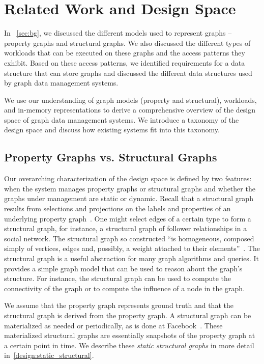 \chapter{Related Work and Design Space}
\label{chap:design_space}

In ~\autoref{sec:bg}, we discussed the different models used to represent graphs -- property graphs and structural graphs. 
We also discussed the different types of workloads that can be executed on these graphs and the access patterns they exhibit.
Based on these access patterns, we identified requirements for a data structure that can store graphs and discussed the different data structures used by graph data management systems.

We use our understanding of graph models (property and structural), workloads, and in-memory representations to derive a comprehensive overview of the design space of graph data management systems.
We introduce a taxonomy of the design space and discuss how existing systems fit into this taxonomy.


\section{Property Graphs vs. Structural Graphs}
\label{design:property_vs_structural}
Our overarching characterization of the design space is defined by two features: when the system manages property graphs or structural graphs and whether the graphs under management are static or dynamic.
Recall that a structural graph results from selections and projections on the labels and properties of an underlying property graph~\cite{RodriguezNeubauer2010}.
One might select edges of a certain type to form a structural graph, for instance, a structural graph of follower relationships in a social network.
The structural graph so constructed ``is homogeneous, composed simply of vertices, edges and, possibly, a weight attached to their elements''~\cite{teseo2021deLeo}.
The structural graph is a useful abstraction for many graph algorithms and queries. It provides a simple graph model that can be used to reason about the graph's structure.
For instance, the structural graph can be used to compute the connectivity of the graph or to compute the influence of a node in the graph.

We assume that the property graph represents ground truth and that the structural graph is derived from the property graph.
A structural graph can be materialized as needed or periodically, as is done at Facebook~\cite{curtiss2013unicorn}.
These materialized structural graphs are essentially snapshots of the property graph at a certain point in time.
We describe these \emph{static structural graphs} in more detail in~\autoref{design:static_structural}.

